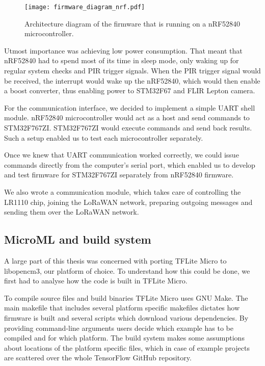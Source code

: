 \begin{figure}[ht]
        \centering
        \texttt{[image: firmware\_diagram\_nrf.pdf]} 
        \caption{ Architecture diagram of the firmware that is running on a nRF52840 microcontroller.} 
        \label{firmware_diagram_wisent}
\end{figure}

Utmost importance was achieving low power consumption.
That meant that nRF52840 had to spend most of its time in sleep mode, only waking up for regular system checks and PIR trigger signals.
When the PIR trigger signal would be received, the interrupt would wake up the nRF52840, which would then enable a boost converter, thus enabling power to STM32F67 and FLIR Lepton camera.

For the communication interface, we decided to implement a simple UART shell module.
nRF52840 microcontroller would act as a host and send commands to STM32F767ZI.
STM32F767ZI would execute commands and send back results.
Such a setup enabled us to test each microcontroller separately.

Once we knew that UART communication worked correctly, we could issue commands directly from the computer's serial port, which enabled us to develop and test firmware for STM32F767ZI separately from nRF52840 firmware.

We also wrote a communication module, which takes care of controlling the LR1110 chip, joining the LoRaWAN network, preparing outgoing messages and sending them over the LoRaWAN network.


\subsection{ MicroML and build system} \label{build_system_label}

A large part of this thesis was concerned with porting TFLite Micro to libopencm3, our platform of choice.
To understand how this could be done, we first had to analyse how the code is built in TFLite Micro.

To compile source files and build binaries TFLite Micro uses GNU Make.
The main makefile that includes several platform specific makefiles dictates how firmware is built and several scripts which download various dependencies.
By providing command-line arguments users decide which example has to be compiled and for which platform.
The build system makes some assumptions about locations of the platform specific files, which in case of example projects are scattered over the whole TensorFlow GitHub repository.

